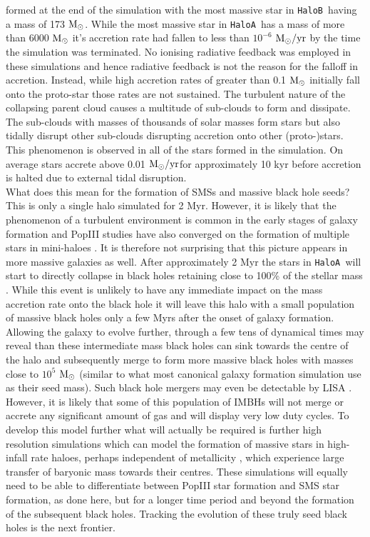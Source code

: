 \documentclass[graphics, twocolumn, usenatbib]{mn2e}
\newcommand{\msolar} {$\rm{M_{\odot}}~$}
\newcommand{\msolarc} {$\rm{M_{\odot}}$}
\newcommand{\msolaryr} {$\rm{M_{\odot}/yr}~$}
\newcommand{\msolaryrc} {$\rm{M_{\odot}/yr}$}
\newcommand{\ha} {\texttt{HaloA~}}
\newcommand{\hb} {\texttt{HaloB~}}
\begin{document}
formed at the end of the simulation with the most massive star in \hb having a mass of 173 \msolarc.
While the most massive star in \ha has a mass of more than 6000 \msolar it's accretion rate had fallen
to less than $10^{-6}$ \msolaryr by the time the simulation was terminated. No ionising radiative
feedback was employed in these simulations and hence radiative feedback is not the reason for
the falloff in accretion. Instead, while high accretion rates of greater than 0.1 \msolar initially
fall onto the proto-star those rates are not sustained. The turbulent nature of the collapsing parent
cloud causes a multitude of sub-clouds to form and dissipate. The sub-clouds with masses of
thousands of solar masses form stars but also tidally disrupt other sub-clouds disrupting
accretion onto other (proto-)stars. This phenomenon is observed in all of the stars formed in the simulation.
On average stars accrete above 0.01 \msolaryrc for approximately 10 kyr before accretion is halted
due to external tidal disruption. \\
\indent What does this mean for the formation of SMSs and massive black hole seeds? This is only a
single halo simulated for 2 Myr. However, it is likely that the phenomenon of a turbulent environment is common in the early stages of galaxy formation and PopIII studies have also converged on the
formation of multiple stars in mini-haloes \citep[e.g.][]{Turk_2012}. It is therefore not surprising that this picture appears in
more massive galaxies as well. After approximately 2 Myr the stars in \ha will start to directly
collapse in black holes retaining close to 100\% of the stellar mass \citep{Heger_2003}. While this
event is unlikely to have any immediate impact on the mass accretion rate onto the black hole it will
leave this halo with a small population of massive black holes only a few Myrs after the onset of galaxy formation. Allowing the galaxy to evolve further, through a few tens of dynamical times may
reveal than these intermediate mass black holes can sink towards the centre of the halo and subsequently merge to form more massive black holes with masses close to $10^5$ \msolar (similar to what most canonical galaxy formation
simulation use as their seed mass). Such black hole mergers may even be
detectable by LISA \cite{Hartwig_2018}. However, it is likely that some of this population of IMBHs will not merge or accrete any significant amount of gas and will display very low duty cycles. To develop this model further what will actually be required is further high
resolution simulations which can model the formation of massive stars in high-infall rate haloes,
perhaps independent of metallicity \citep[][Regan et al. 2020]{Chon_2020}, which experience
large transfer of baryonic mass towards their centres. These simulations will equally need to
be able to differentiate between PopIII star formation and SMS star formation, as done here, but
for a longer time period and beyond the formation of the subsequent black holes.
Tracking the evolution of these truly seed black holes is the next frontier. 




\label{lastpage}


\end{document}
